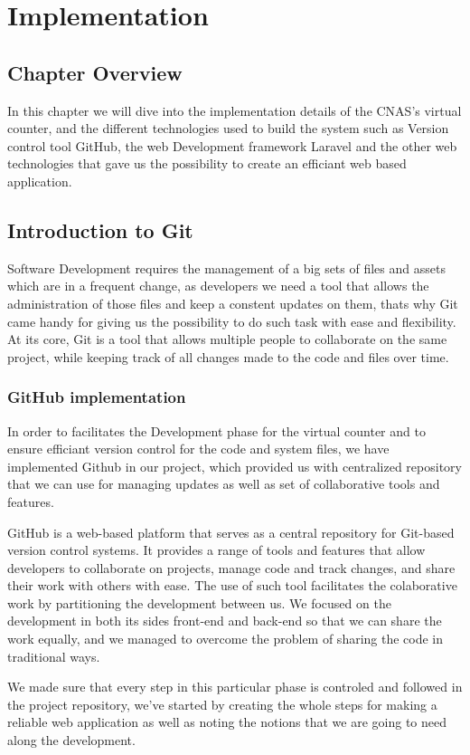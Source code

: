 \chapter{Implementation}
\section{Chapter Overview}
In this chapter we will dive into the implementation details of the CNAS's virtual counter, and the different technologies used to build the system such as Version control tool GitHub, the web Development framework Laravel and the other web technologies that gave us the possibility to create an efficiant web based application.
\section{Introduction to Git }
Software Development requires the management of a big sets of files and assets which are in a frequent change, as developers we need a tool that allows the administration of those files and keep a constent updates on them, thats why Git came handy for giving us the possibility to do such task with ease and flexibility. At its core, Git is a tool that allows multiple people to collaborate on the same project, while keeping track of all changes made to the code and files over time.
\subsection{GitHub implementation}
In order to facilitates the Development phase for the virtual counter and to ensure efficiant version control for the code and system files, we have implemented Github in our project, which provided us with centralized repository that we can use for managing updates as well as set of collaborative tools and features. 

\medskip GitHub is a web-based platform that serves as a central repository for Git-based version control systems. It provides a range of tools and features that allow developers to collaborate on projects, manage code and track changes, and share their work with others with ease. The use of such tool facilitates the colaborative work by partitioning the development between us. We focused on the development in both its sides front-end and back-end so that we can share the work equally, and we managed to overcome the problem of sharing the code in traditional ways. 

 We made sure that every step in this particular phase is controled and followed in the project repository, we've started by creating the whole steps for making a reliable web application as well as noting the notions that we are going to need along the development. 
